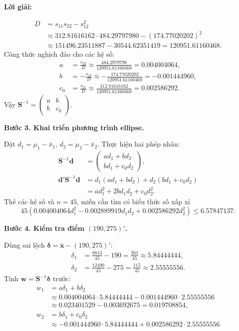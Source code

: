 \documentclass[11pt,a4paper]{article}
\renewcommand{\boldsymbol}[1]{\symbf{#1}}
\newenvironment{solution}{%
  \par\medskip\noindent\textbf{Lời giải:}\par\nobreak\smallskip\noindent\ignorespaces
}{\par}
\newcommand{\answer}[1]{\boxed{#1}}
\newcommand{\step}[2]{\par\medskip\noindent\textbf{Bước #1. #2}\par\nopagebreak[4]\smallskip\noindent}
\begin{document}
\begin{solution}
\begin{enumerate}[label=\textbf{\alph*)}]
\begin{align*}
D&=s_{11}s_{22}-s_{12}^2\\
&\approx312.81616162\cdot484.29797980-(174.77020202)^2\\
&\approx151496.23511887-30544.62351419
=120951.61160468.
\end{align*}
Công thức nghịch đảo cho các hệ số:
\begin{align*}
a&=\frac{s_{22}}D\approx\frac{484.2979798}{120951.61160468}
=0.004004064,\\
b&=-\frac{s_{12}}D\approx-\frac{174.77020202}{120951.61160468}
=-0.001444960,\\
c_0&=\frac{s_{11}}D\approx\frac{312.81616162}{120951.61160468}
=0.002586292.
\end{align*}
Vậy $\mathbf{S}^{-1}=\begin{pmatrix}a&b\\b&c_0\end{pmatrix}$.
\step{3}{Khai triển phương trình ellipse.}
Đặt $d_1=\mu_1-\bar{x}_1$, $d_2=\mu_2-\bar{x}_2$.
Thực hiện hai phép nhân:
\begin{align*}
\mathbf{S}^{-1}\mathbf{d}&=\begin{pmatrix}ad_1+bd_2\\bd_1+c_0d_2\end{pmatrix},\\
\mathbf{d}'\mathbf{S}^{-1}\mathbf{d}
&=d_1(ad_1+bd_2)+d_2(bd_1+c_0d_2)\\
&=ad_1^2+2bd_1d_2+c_0d_2^2.
\end{align*}
Thế các hệ số và $n=45$, miền cần tìm có biểu thức số xấp xỉ
\[
\answer{45\left(0.004004064d_1^2-0.002889919d_1d_2
+0.002586292d_2^2\right)\le6.57847137}.
\]
\step{4}{Kiểm tra điểm $(190,275)'$.}
Dùng sai lệch $\boldsymbol{\delta}=\bar{\mathbf{x}}-(190,275)'$:
\begin{align*}
\delta_1&=\frac{8813}{45}-190=\frac{263}{45}\approx5.84444444,\\
\delta_2&=\frac{12490}{45}-275=\frac{115}{45}\approx2.55555556.
\end{align*}
Tính $\mathbf{w}=\mathbf{S}^{-1}\boldsymbol{\delta}$ trước:
\begin{align*}
w_1&=a\delta_1+b\delta_2\\
&\approx0.004004064\cdot5.84444444
-0.001444960\cdot2.55555556\\
&\approx0.023401529-0.003692675=0.019708854,\\
w_2&=b\delta_1+c_0\delta_2\\
&\approx-0.001444960\cdot5.84444444
+0.002586292\cdot2.55555556\\

\end{align*}
\end{enumerate}
\end{solution}
\end{document}
